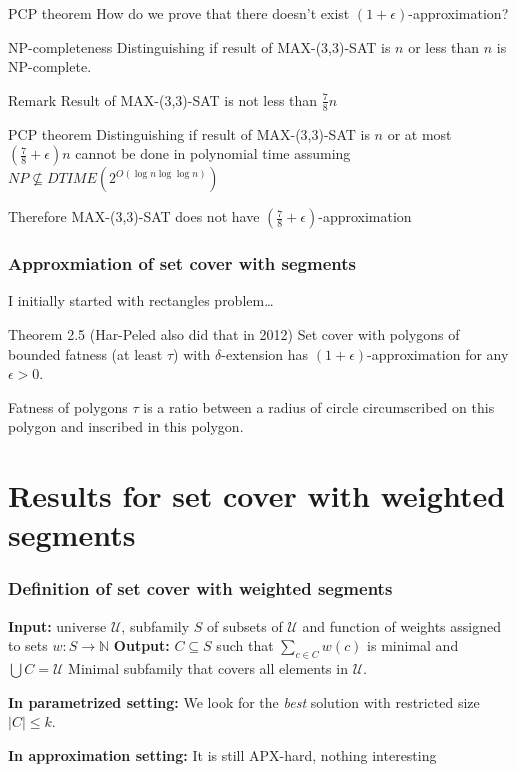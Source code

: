 \documentclass{beamer}
\begin{document}
\begin{frame}{PCP theorem}
How do we prove that there doesn't exist $(1+\epsilon)$-approximation?
\begin{block}{NP-completeness}
Distinguishing if result of MAX-(3,3)-SAT is
$n$ or less than $n$ is NP-complete.
\end{block}

\begin{block}{Remark}
Result of MAX-(3,3)-SAT is not less than $\frac{7}{8}n$
\end{block}

\begin{block}{PCP theorem}
Distinguishing if result of MAX-(3,3)-SAT is $n$
or at most $(\frac{7}{8} + \epsilon)n$
cannot be done in polynomial time assuming $NP \nsubseteq DTIME(2^{O(\log n \log \log n)})$
\end{block}

Therefore MAX-(3,3)-SAT does not have
$(\frac{7}{8}+\epsilon)$-approximation


\end{frame}

\begin{frame}
\frametitle{Approxmiation of set cover with segments}
I initially started with rectangles problem\ldots

\begin{block}{Theorem 2.5 (Har-Peled also did that in 2012)}
	Set cover with polygons of bounded fatness (at least $\tau$)
	 with $\delta$-extension has $(1+\epsilon)$-approximation
	 for any $\epsilon > 0$.
	
\end{block}

\begin{definition}{
Fatness of polygons $\tau$ is a ratio between a radius of circle
circumscribed on this polygon and inscribed in this polygon.
}\end{definition}



\end{frame}


\section{Results for set cover with weighted segments} 

\begin{frame}
\frametitle{Definition of set cover with weighted segments}

\textbf{Input:} universe $\mathcal{U}$,
subfamily $S$ of subsets of $\mathcal{U}$
and function of weights assigned to sets $w : S \rightarrow \mathbb{N}$
\newline
\textbf{Output:} $C \subseteq S$ such that $\sum_{c \in C} w(c)$ is minimal and
$\bigcup C = \mathcal{U}$
\newline
Minimal subfamily that covers all elements in $\mathcal{U}$.

\bigskip
\textbf{In parametrized setting:}
We look for the \textit{best} solution with restricted size $|C| \le k$.

\textbf{In approximation setting:}
It is still APX-hard, nothing interesting


\end{frame}
\end{document}

